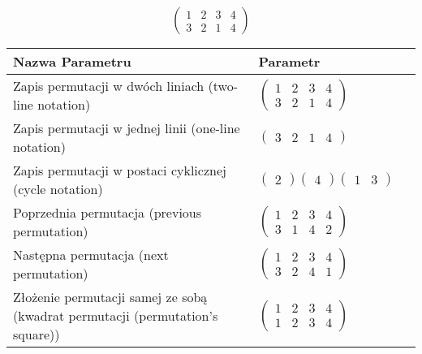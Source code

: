\documentclass[12pt]{article}
\begin{document}
\subsection{}
\begin{center}
\[
\begin{pmatrix}
	1 & 2 & 3 & 4 \\ 
	3 & 2 & 1 & 4 
\end{pmatrix}
\]

\begin{tabular}{|m{0.6\linewidth}|m{0.4\linewidth}|}
	\hline
	Nazwa Parametru & Parametr \\
	\hline
	Zapis permutacji w dwóch liniach (two-line notation) & $\begin{pmatrix} 1 & 2 & 3 & 4 \\ 
3 & 2 & 1 & 4 \end{pmatrix}$ \\ 
	\hline
	Zapis permutacji w jednej linii (one-line notation) & $\begin{pmatrix} 3 & 2 & 1 & 4 \end{pmatrix}$ \\ 
	\hline
	Zapis permutacji w postaci cyklicznej (cycle notation) & $\begin{pmatrix} 2 \end{pmatrix} \begin{pmatrix} 4 \end{pmatrix} \begin{pmatrix} 1 & 3 \end{pmatrix} $ \\ 
	\hline
	Poprzednia permutacja (previous permutation) & $\begin{pmatrix} 1 & 2 & 3 & 4 \\ 
3 & 1 & 4 & 2 \end{pmatrix}$ \\ 
	\hline
	Następna permutacja (next permutation) & $\begin{pmatrix} 1 & 2 & 3 & 4 \\ 
3 & 2 & 4 & 1 \end{pmatrix}$ \\ 
	\hline
	Złożenie permutacji samej ze sobą (kwadrat permutacji (permutation's square)) & $\begin{pmatrix} 1 & 2 & 3 & 4 \\ 
1 & 2 & 3 & 4 \end{pmatrix}$ \\ 
	\hline
\end{tabular}
\end{center}
\end{document}
